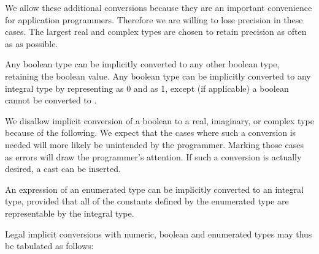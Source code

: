 
\begin{rationale}
We allow these additional conversions because they are an important
convenience for application programmers. Therefore we are willing to
lose precision in these cases. The largest real and complex types
are chosen to retain precision as often as as possible.
\end{rationale}

Any boolean type can be implicitly converted to any other boolean type,
retaining the boolean value.
Any boolean type can be implicitly converted to any integral type
by representing  as 0 and  as 1,
except (if applicable)
a boolean cannot be converted to .

\begin{rationale}
We disallow implicit conversion of a boolean to
a real, imaginary, or complex type because of the following.
We expect that the cases where such a conversion is needed
will more likely be unintended by the programmer.
Marking those cases as errors will draw the programmer's attention.
If such a conversion is actually desired, a cast 
can be inserted.
\end{rationale}

An expression of an enumerated type can be implicitly converted
to an integral type, provided that all of the constants defined by the
enumerated type are representable by the integral type.


Legal implicit conversions with numeric, boolean and enumerated types
may thus be tabulated as follows:


